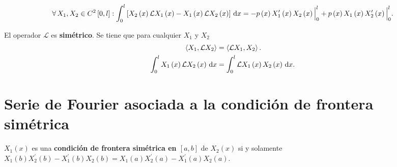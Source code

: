\begin{theorem}
    \begin{equation*}
        \forall X_{1},X_{2}\in C^{2}\left[0,l\right]:
        \int_{0}^{l}
        \left[
        X_{2}\left(x\right)
        \mathcal{L}X_{1}\left(x\right)-
        X_{1}\left(x\right)
        \mathcal{L}X_{2}\left(x\right)
        \right]
        \dl x=
        {
        -p\left(x\right)
        X^{\prime}_{1}\left(x\right)
        X_{2}\left(x\right)
        \Big|}_{0}^{l}+
        {
        p\left(x\right)
        X_{1}\left(x\right)
        X_{2}^{\prime}\left(x\right)
        \Big|}_{0}^{l}.
    \end{equation*}
\end{theorem}

\begin{theorem}
    El operador $\mathcal{L}$ es \textbf{simétrico}.
    Se tiene que para cualquier $X_{1}$ y $X_{2}$
    \begin{align*}
        \left\langle X_{1},\mathcal{L}X_{2}\right\rangle & =
        \left\langle \mathcal{L}X_{1},X_{2}\right\rangle.    \\
        \int_{0}^{l}
        X_{1}\left(x\right)
        \mathcal{L}X_{2}\left(x\right)
        \dl x                                            & =
        \int_{0}^{l}
        \mathcal{L}X_{1}\left(x\right)
        X_{2}\left(x\right)
        \dl x.
    \end{align*}
\end{theorem}

\section{Serie de Fourier asociada a la condición de frontera simétrica}

%
\begin{definition}
    $X_{1}\left(x\right)$ es una
    \textbf{condición de frontera simétrica en $\left[a,b\right]$} de
    $X_{2}\left(x\right)$ si y solamente
    \begin{math}
        X_{1}\left(b\right)
        X^{\prime}_{2}\left(b\right)-
        X^{\prime}_{1}\left(b\right)
        X_{2}\left(b\right)=
        X_{1}\left(a\right)
        X^{\prime}_{2}\left(a\right)-
        X^{\prime}_{1}\left(a\right)
        X_{2}\left(a\right).
    \end{math}
\end{definition}

